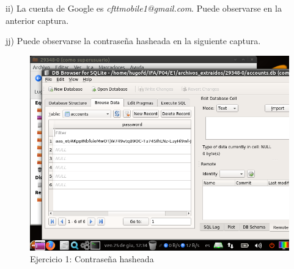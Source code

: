 \documentclass[11pt]{article}
\begin{document}
ii) La cuenta de Google es \textit{cfttmobile1@gmail.com}. Puede observarse en la anterior captura.

jj) Puede observarse la contraseña hasheada en la siguiente captura.

\begin{figure}[H]
    \caption{Ejercicio 1: Contraseña hasheada}
    \centering
    \includegraphics[scale=0.7]{e1-33.png}
\end{figure}



\begin{thebibliography}{8}
\end{thebibliography}
\end{document}
